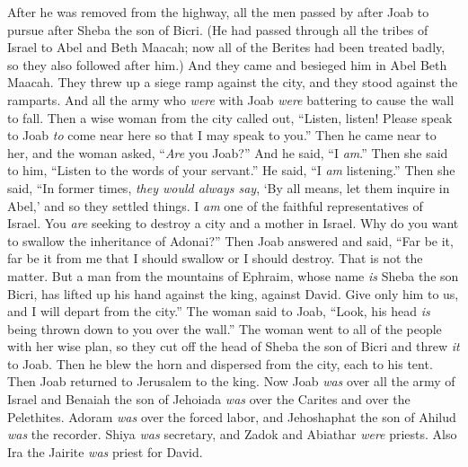 \begin{biblechapter}
\verse After he was removed from the highway, all the men passed by after Joab to pursue after Sheba the son of Bicri.
 (He had passed through all the tribes of Israel to Abel and Beth Maacah; now all of the Berites had been treated badly, so they also followed after him.)
\verse And they came and besieged him in Abel Beth Maacah. They threw up a siege ramp against the city, and they stood against the ramparts. And all the army who \textit{were} with Joab \textit{were} battering to cause the wall to fall.
\verse Then a wise woman from the city called out, “Listen, listen! Please speak to Joab \textit{to} come near here so that I may speak to you.”
\verse Then he came near to her, and the woman asked, “\textit{Are} you Joab?” And he said, “I \textit{am}.” Then she said to him, “Listen to the words of your servant.” He said, “I \textit{am} listening.”
\verse Then she said, “In former times, \textit{they would always say}, ‘By all means, let them inquire in Abel,’ and so they settled things.
\verse I \textit{am} one of the faithful representatives of Israel. You \textit{are} seeking to destroy a city and a mother in Israel. Why do you want to swallow the inheritance of Adonai?”
\verse Then Joab answered and said, “Far be it, far be it from me that I should swallow or I should destroy.
\verse That is not the matter. But a man from the mountains of Ephraim, whose name \textit{is} Sheba the son Bicri, has lifted up his hand against the king, against David. Give only him to us, and I will depart from the city.” The woman said to Joab, “Look, his head \textit{is} being thrown down to you over the wall.”
\verse The woman went to all of the people with her wise plan, so they cut off the head of Sheba the son of Bicri and threw \textit{it} to Joab. Then he blew the horn and dispersed from the city, each to his tent. Then Joab returned to Jerusalem to the king.
\verse Now Joab \textit{was} over all the army of Israel and Benaiah the son of Jehoiada \textit{was} over the Carites and over the Pelethites.
\verse Adoram \textit{was} over the forced labor, and Jehoshaphat the son of Ahilud \textit{was} the recorder.
\verse Shiya \textit{was} secretary, and Zadok and Abiathar \textit{were} priests.
\verse Also Ira the Jairite \textit{was} priest for David.
\end{biblechapter}

